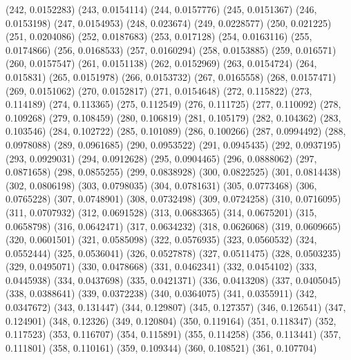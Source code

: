 {					(242, 0.0152283)
					(243, 0.0154114)
					(244, 0.0157776)
					(245, 0.0151367)
					(246, 0.0153198)
					(247, 0.0154953)
					(248, 0.023674)
					(249, 0.0228577)
					(250, 0.021225)
					(251, 0.0204086)
					(252, 0.0187683)
					(253, 0.017128)
					(254, 0.0163116)
					(255, 0.0174866)
					(256, 0.0168533)
					(257, 0.0160294)
					(258, 0.0153885)
					(259, 0.016571)
					(260, 0.0157547)
					(261, 0.0151138)
					(262, 0.0152969)
					(263, 0.0154724)
					(264, 0.015831)
					(265, 0.0151978)
					(266, 0.0153732)
					(267, 0.0165558)
					(268, 0.0157471)
					(269, 0.0151062)
					(270, 0.0152817)
					(271, 0.0154648)
					(272, 0.115822)
					(273, 0.114189)
					(274, 0.113365)
					(275, 0.112549)
					(276, 0.111725)
					(277, 0.110092)
					(278, 0.109268)
					(279, 0.108459)
					(280, 0.106819)
					(281, 0.105179)
					(282, 0.104362)
					(283, 0.103546)
					(284, 0.102722)
					(285, 0.101089)
					(286, 0.100266)
					(287, 0.0994492)
					(288, 0.0978088)
					(289, 0.0961685)
					(290, 0.0953522)
					(291, 0.0945435)
					(292, 0.0937195)
					(293, 0.0929031)
					(294, 0.0912628)
					(295, 0.0904465)
					(296, 0.0888062)
					(297, 0.0871658)
					(298, 0.0855255)
					(299, 0.0838928)
					(300, 0.0822525)
					(301, 0.0814438)
					(302, 0.0806198)
					(303, 0.0798035)
					(304, 0.0781631)
					(305, 0.0773468)
					(306, 0.0765228)
					(307, 0.0748901)
					(308, 0.0732498)
					(309, 0.0724258)
					(310, 0.0716095)
					(311, 0.0707932)
					(312, 0.0691528)
					(313, 0.0683365)
					(314, 0.0675201)
					(315, 0.0658798)
					(316, 0.0642471)
					(317, 0.0634232)
					(318, 0.0626068)
					(319, 0.0609665)
					(320, 0.0601501)
					(321, 0.0585098)
					(322, 0.0576935)
					(323, 0.0560532)
					(324, 0.0552444)
					(325, 0.0536041)
					(326, 0.0527878)
					(327, 0.0511475)
					(328, 0.0503235)
					(329, 0.0495071)
					(330, 0.0478668)
					(331, 0.0462341)
					(332, 0.0454102)
					(333, 0.0445938)
					(334, 0.0437698)
					(335, 0.0421371)
					(336, 0.0413208)
					(337, 0.0405045)
					(338, 0.0388641)
					(339, 0.0372238)
					(340, 0.0364075)
					(341, 0.0355911)
					(342, 0.0347672)
					(343, 0.131447)
					(344, 0.129807)
					(345, 0.127357)
					(346, 0.126541)
					(347, 0.124901)
					(348, 0.12326)
					(349, 0.120804)
					(350, 0.119164)
					(351, 0.118347)
					(352, 0.117523)
					(353, 0.116707)
					(354, 0.115891)
					(355, 0.114258)
					(356, 0.113441)
					(357, 0.111801)
					(358, 0.110161)
					(359, 0.109344)
					(360, 0.108521)
					(361, 0.107704)
}
